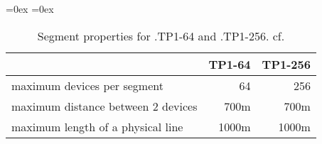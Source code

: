 \begin{table}[h]
	\aboverulesep=0ex
	\belowrulesep=0ex
	\renewcommand{\arraystretch}{1.2}
	
	\centering
	\begin{tabular}{|l|r|r|}
		\toprule
		& \textbf{TP1-64} & \textbf{TP1-256} \\\midrule
		maximum devices per segment & 64 & 256 \\
		maximum distance between 2 devices & 700m & 700m \\
		maximum length of a physical line & 1000m & 1000m \\
		\bottomrule
	\end{tabular}
	\caption[Segment properties for \knx.TP1-64 and \knx.TP1-256]{Segment properties for \knx.TP1-64 and \knx.TP1-256. cf. \textcite{Sokollik2017}}
	\label{tab:background:bas:knx:topo:tpsegments}
\end{table}